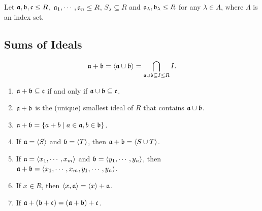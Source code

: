 Let $\mathfrak{a},\mathfrak{b},\mathfrak{c} \leq R$, $\mathfrak{a}_1,\cdots,\mathfrak{a}_n \leq R$, $S_\lambda \subseteq R$ and $\mathfrak{a}_\lambda,\mathfrak{b}_\lambda \leq R$ for any $\lambda \in \Lambda$, where $\Lambda$ is an index set.

\subsection*{Sums of Ideals}

\begin{definition}
    \[\mathfrak{a} + \mathfrak{b} = \langle \mathfrak{a} \cup \mathfrak{b} \rangle = \bigcap_{\mathfrak{a} \cup \mathfrak{b} \subseteq I \leq R}I.\]
\end{definition}

\begin{fact}
    \begin{enumerate}
        \item $\mathfrak{a} + \mathfrak{b} \subseteq \mathfrak{c}$ if and only if $\mathfrak{a} \cup \mathfrak{b} \subseteq \mathfrak{c}$.
        \item $\mathfrak{a} + \mathfrak{b}$ is the (unique) smallest ideal of $R$ that contains $\mathfrak{a} \cup \mathfrak{b}$.
        \item $\mathfrak{a} + \mathfrak{b} = \{a + b \mid a \in \mathfrak{a}, b \in \mathfrak{b}\}$.
        \item If $\mathfrak{a} = \langle S \rangle$ and $\mathfrak{b} = \langle T \rangle$, then $\mathfrak{a} + \mathfrak{b} = \langle S \cup T \rangle$.
        \item If $\mathfrak{a} = \langle x_1,\cdots,x_m \rangle$ and $\mathfrak{b} = \langle y_1,\cdots,y_n \rangle$, then $\mathfrak{a} + \mathfrak{b} = \langle x_1,\cdots,x_m, y_1,\cdots,y_n \rangle$.
        \item If $x \in R$, then $\langle x,\mathfrak{a} \rangle = \langle x \rangle + \mathfrak{a}$.
        \item If $\mathfrak{a} + (\mathfrak{b} + \mathfrak{c}) = (\mathfrak{a} + \mathfrak{b}) + \mathfrak{c}$.
    \end{enumerate}
\end{fact}

